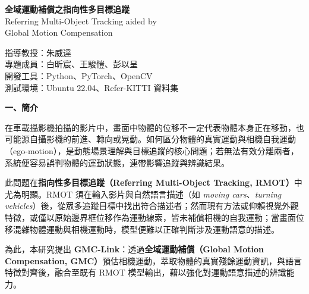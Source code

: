 \documentclass[12pt]{article}
\begin{document}
\begin{center}
  {\bfseries\fontsize{20pt}{24pt}\selectfont
    全域運動補償之指向性多目標追蹤}\\[8pt]
  {\fontsize{15pt}{19pt}\selectfont
    Referring Multi-Object Tracking aided by\\[2pt]
    Global Motion Compensation}
\end{center}

\vspace{4pt}

\begin{flushright}
  \begin{minipage}{0.62\textwidth}
    \begin{flushleft}
      指導教授：朱威達 \\[2pt]
      專題成員：白昕宸、王駿愷、彭以呈 \\[2pt]
      開發工具：Python、PyTorch、OpenCV\\[2pt]
      測試環境：Ubuntu 22.04、Refer-KITTI 資料集
    \end{flushleft}
  \end{minipage}
\end{flushright}

\vspace{4pt}

{\bfseries\fontsize{15pt}{19pt}\selectfont 一、簡介}
\vspace{2pt}

\justifying
在車載攝影機拍攝的影片中，畫面中物體的位移不一定代表物體本身正在移動，也可能源自攝影機的前進、轉向或晃動。如何區分物體的真實運動與相機自我運動（ego-motion），是動態場景理解與目標追蹤的核心問題；若無法有效分離兩者，系統便容易誤判物體的運動狀態，連帶影響追蹤與辨識結果。

此問題在\textbf{指向性多目標追蹤（Referring Multi-Object Tracking, RMOT）}中尤為明顯。RMOT 須在輸入影片與自然語言描述（如 \textit{moving cars}、\textit{turning vehicles}）後，從眾多追蹤目標中找出符合描述者；然而現有方法或仰賴視覺外觀特徵，或僅以原始邊界框位移作為運動線索，皆未補償相機的自我運動；當畫面位移混雜物體運動與相機運動時，模型便難以正確判斷涉及運動語意的描述。

為此，本研究提出 \textbf{GMC-Link}：透過\textbf{全域運動補償（Global Motion Compensation, GMC）}預估相機運動，萃取物體的真實殘餘運動資訊，與語言特徵對齊後，融合至既有 RMOT 模型輸出，藉以強化對運動語意描述的辨識能力。
\end{document}
